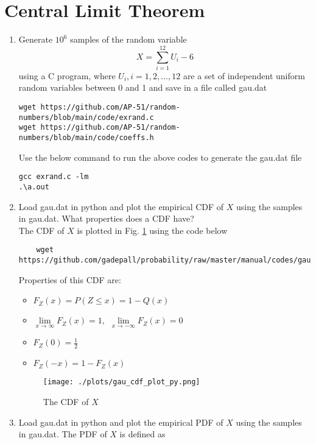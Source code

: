 \documentclass[journal,12pt,twocolumn]{IEEEtran}
\renewcommand\thesection{\arabic{section}}
\begin{document}
\section{Central Limit Theorem}
%
\begin{enumerate}[label=\thesection.\arabic*
,ref=\thesection.\theenumi]
%
\item
Generate $10^6$ samples of the random variable
%
\begin{equation}
X = \sum_{i=1}^{12}U_i -6
\end{equation}
%
using a C program, where $U_i, i = 1,2,\dots, 12$ are  a set of independent uniform random variables between 0 and 1
and save in a file called gau.dat
\solution
\begin{lstlisting}
wget https://github.com/AP-51/random-numbers/blob/main/code/exrand.c
wget https://github.com/AP-51/random-numbers/blob/main/code/coeffs.h
\end{lstlisting}
Use the below command to run the above codes to generate the gau.dat file
\begin{lstlisting}
gcc exrand.c -lm
.\a.out
\end{lstlisting}
\item
Load gau.dat in python and plot the empirical CDF of $X$ using the samples in gau.dat. What properties does a CDF have?\\
\solution The CDF of $X$ is plotted in Fig. \ref{fig:gauss_cdf} using the code below
\begin{lstlisting}
    wget https://github.com/gadepall/probability/raw/master/manual/codes/gau_cdf_plot.py
    \end{lstlisting}
Properties of this CDF are:
\begin{itemize}
    \item $F_{Z}(x)=P(Z \leq x)= 1-Q(x) $
    \item $\lim \limits_{x\rightarrow \infty} F_{Z}(x)=1, \hspace{5pt} \lim \limits_{x\rightarrow -\infty} F_{Z}(x)=0$
    \item  $F_{Z}(0)=\frac{1}{2}$
    \item  $F_{Z}(-x)=1-F_{Z}(x)$
    \end{itemize}
\begin{figure}[h]
\centering
\texttt{[image: ./plots/gau\_cdf\_plot\_py.png]}
\caption{The CDF of $X$}
\label{fig:gauss_cdf}
\end{figure}
\item
Load gau.dat in python and plot the empirical PDF of $X$ using the samples in gau.dat. The PDF of $X$ is defined as

\end{enumerate}
\end{document}
